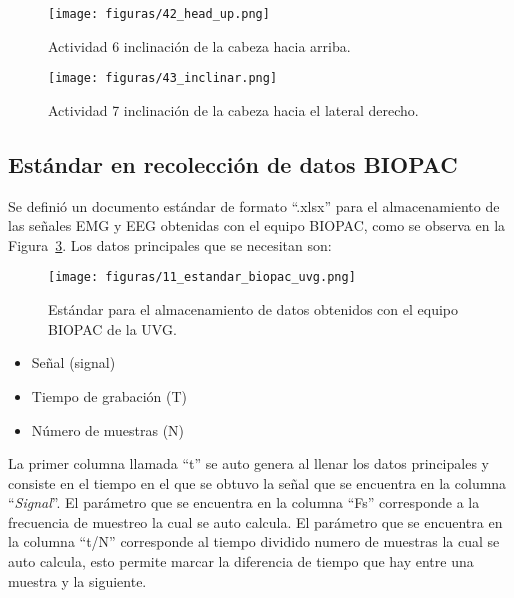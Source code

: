 \begin{figure}[H]
	\centering
	\texttt{[image: figuras/42\_head\_up.png]}
	\caption{Actividad 6 inclinación de la cabeza hacia arriba.}
	\label{fig: eeg_actividad6}
\end{figure}

\begin{figure}[H]
	\centering
	\texttt{[image: figuras/43\_inclinar.png]}
	\caption{Actividad 7 inclinación de la cabeza hacia el lateral derecho.}
	\label{fig: eeg_actividad7}
\end{figure}

\subsection{Estándar en recolección de datos BIOPAC}
Se definió un documento estándar de formato ``.xlsx'' para el almacenamiento de las señales EMG y EEG obtenidas con el equipo BIOPAC,  como se observa en la Figura~\ref{fig:Estandar_bipoac_uvg}. Los datos principales que se necesitan son:

\begin{figure}[H]
    \centering
    \texttt{[image: figuras/11\_estandar\_biopac\_uvg.png]}
    \caption{Estándar para el almacenamiento de datos obtenidos con el equipo BIOPAC de la UVG.}
    \label{fig:Estandar_bipoac_uvg}
\end{figure}

\begin{itemize}
    \item Señal (signal)
    \item Tiempo de grabación (T)  
    \item Número de muestras (N)
\end{itemize}

La primer columna llamada ``t'' se auto genera al llenar los datos principales y consiste en el tiempo en el que se obtuvo la señal que se encuentra en la columna ``\textit{Signal}''. 
El parámetro que se encuentra en la columna ``Fs'' corresponde a la frecuencia de muestreo la cual se auto calcula.
El parámetro que se encuentra en la columna ``t/N'' corresponde al tiempo dividido numero de muestras la cual se auto calcula, esto permite marcar la diferencia de tiempo que hay entre una muestra y la siguiente.

